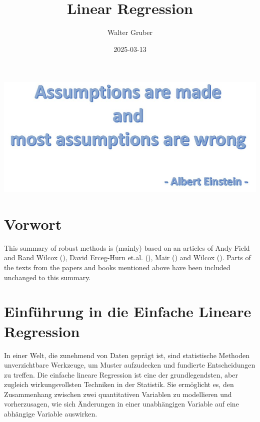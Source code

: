 \documentclass[
]{article}
\title{Linear Regression}
\author{Walter Gruber}
\date{2025-03-13}
\begin{document}
\maketitle

{
\setcounter{tocdepth}{2}
\tableofcontents
}
\section*{}\label{section}

\includegraphics[width=1\textwidth,height=\textheight]{Images/Assumptions.JPG}

\section*{Vorwort}\label{vorwort}

This summary of robust methods is (mainly) based on an articles of Andy Field and Rand Wilcox (), David Erceg-Hurn et.al. (), Mair () and Wilcox (). Parts of the texts from the papers and books mentioned above have been included unchanged to this summary.

\section*{Einführung in die Einfache Lineare Regression}\label{einfuxfchrung-in-die-einfache-lineare-regression}

In einer Welt, die zunehmend von Daten geprägt ist, sind statistische Methoden unverzichtbare Werkzeuge, um Muster aufzudecken und fundierte Entscheidungen zu treffen. Die einfache lineare Regression ist eine der grundlegendsten, aber zugleich wirkungsvollsten Techniken in der Statistik. Sie ermöglicht es, den Zusammenhang zwischen zwei quantitativen Variablen zu modellieren und vorherzusagen, wie sich Änderungen in einer unabhängigen Variable auf eine abhängige Variable auswirken.
\end{document}
